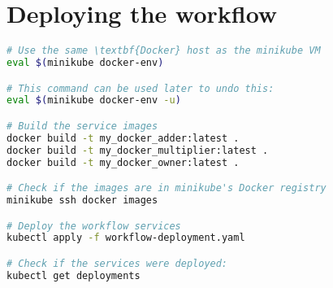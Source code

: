 \documentclass[12pt]{article}
\begin{document}
\section{Deploying the workflow}

\begin{lstlisting}[language=bash]
# Use the same \textbf{Docker} host as the minikube VM
eval $(minikube docker-env)

# This command can be used later to undo this:
eval $(minikube docker-env -u)

# Build the service images
docker build -t my_docker_adder:latest .
docker build -t my_docker_multiplier:latest .
docker build -t my_docker_owner:latest .

# Check if the images are in minikube's Docker registry
minikube ssh docker images

# Deploy the workflow services
kubectl apply -f workflow-deployment.yaml

# Check if the services were deployed:
kubectl get deployments
\end{lstlisting}


 
\end{document}

